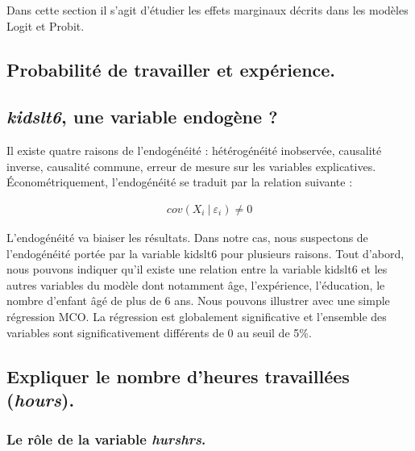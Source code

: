 Dans cette section il s'agit d'étudier les effets marginaux décrits dans les modèles Logit et Probit.


\begin{center}
    \small
    
    \normalsize
\end{center}




\subsection{Probabilité de travailler et expérience.}






\subsection{\emph{kidslt6}, une variable endogène ?}

Il existe quatre raisons de l’endogénéité : hétérogénéité inobservée, causalité inverse, causalité commune, erreur de mesure sur les variables explicatives. Économétriquement, l’endogénéité se traduit par la relation suivante : 

\begin{align*}
    cov(X_i \: | \: \varepsilon_i) \ne 0  
\end{align*}

L’endogénéité va biaiser les résultats. Dans notre cas, nous suspectons de l’endogénéité portée par la variable kidslt6 pour plusieurs raisons. Tout d’abord, nous pouvons indiquer qu’il existe une relation entre la variable kidslt6 et les autres variables du modèle dont notamment âge, l’expérience, l’éducation, le nombre d’enfant âgé de plus de 6 ans. Nous pouvons illustrer avec une simple régression MCO. La régression est globalement significative et l’ensemble des variables sont significativement différents de 0 au seuil de 5\%. 



\subsection{Expliquer le nombre d'heures travaillées (\emph{hours}).}



\subsubsection{Le rôle de la variable \emph{hurshrs}.}

